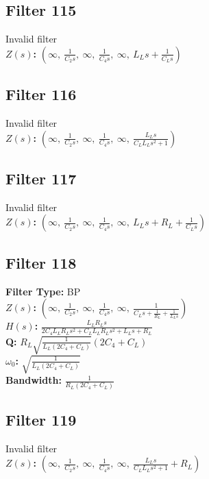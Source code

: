 \documentclass{article}
\begin{document}
\subsection*{Filter 115}
Invalid filter \\ 
\textbf{$Z(s)$:} $\left( \infty, \  \frac{1}{C_{2} s}, \  \infty, \  \frac{1}{C_{4} s}, \  \infty, \  L_{L} s + \frac{1}{C_{L} s}\right)$ \\ 
\subsection*{Filter 116}
Invalid filter \\ 
\textbf{$Z(s)$:} $\left( \infty, \  \frac{1}{C_{2} s}, \  \infty, \  \frac{1}{C_{4} s}, \  \infty, \  \frac{L_{L} s}{C_{L} L_{L} s^{2} + 1}\right)$ \\ 
\subsection*{Filter 117}
Invalid filter \\ 
\textbf{$Z(s)$:} $\left( \infty, \  \frac{1}{C_{2} s}, \  \infty, \  \frac{1}{C_{4} s}, \  \infty, \  L_{L} s + R_{L} + \frac{1}{C_{L} s}\right)$ \\ 
\subsection*{Filter 118}
\textbf{Filter Type:} BP \\ 
\textbf{$Z(s)$:} $\left( \infty, \  \frac{1}{C_{2} s}, \  \infty, \  \frac{1}{C_{4} s}, \  \infty, \  \frac{1}{C_{L} s + \frac{1}{R_{L}} + \frac{1}{L_{L} s}}\right)$ \\ 
\textbf{$H(s)$:} $\frac{L_{L} R_{L} s}{2 C_{4} L_{L} R_{L} s^{2} + C_{L} L_{L} R_{L} s^{2} + L_{L} s + R_{L}}$ \\ 
\textbf{Q:} $R_{L} \sqrt{\frac{1}{L_{L} \left(2 C_{4} + C_{L}\right)}} \left(2 C_{4} + C_{L}\right)$ \\ 
\textbf{$\omega_0$:} $\sqrt{\frac{1}{L_{L} \left(2 C_{4} + C_{L}\right)}}$ \\ 
\textbf{Bandwidth:} $\frac{1}{R_{L} \left(2 C_{4} + C_{L}\right)}$ \\ 
\subsection*{Filter 119}
Invalid filter \\ 
\textbf{$Z(s)$:} $\left( \infty, \  \frac{1}{C_{2} s}, \  \infty, \  \frac{1}{C_{4} s}, \  \infty, \  \frac{L_{L} s}{C_{L} L_{L} s^{2} + 1} + R_{L}\right)$ \\ 
\end{document}
